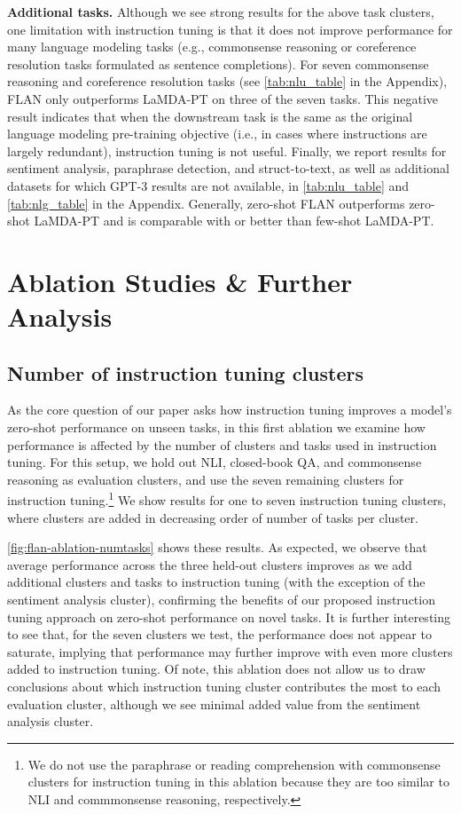\textbf{Additional tasks.} Although we see strong results for the above task clusters, one limitation with instruction tuning is that it does not improve performance for many language modeling tasks (e.g., commonsense reasoning or coreference resolution tasks formulated as sentence completions). For seven commonsense reasoning and coreference resolution tasks (see \ref{tab:nlu_table} in the Appendix), FLAN only outperforms LaMDA-PT on three of the seven tasks. This negative result indicates that when the downstream task is the same as the original language modeling pre-training objective (i.e., in cases where instructions are largely redundant), instruction tuning is not useful. Finally, we report results for sentiment analysis, paraphrase detection, and struct-to-text, as well as additional datasets for which GPT-3 results are not available, in \ref{tab:nlu_table} and \ref{tab:nlg_table} in the Appendix. Generally, zero-shot FLAN outperforms zero-shot LaMDA-PT and is comparable with or better than few-shot LaMDA-PT.

\section{Ablation Studies \& Further Analysis}

\subsection{Number of instruction tuning clusters}\label{subsec:finetuning_clusters}
As the core question of our paper asks how instruction tuning improves a model's zero-shot performance on unseen tasks, in this first ablation we examine how performance is affected by the number of clusters and tasks used in instruction tuning. For this setup, we hold out NLI, closed-book QA, and commonsense reasoning as evaluation clusters, and use the seven remaining clusters for instruction tuning.\footnote{We do not use the paraphrase or reading comprehension with commonsense clusters for instruction tuning in this ablation because they are too similar to NLI and commmonsense reasoning, respectively.} We show results for one to seven instruction tuning clusters, where clusters are added in decreasing order of number of tasks per cluster.

\ref{fig:flan-ablation-numtasks} shows these results. As expected, we observe that average performance across the three held-out clusters improves as we add additional clusters and tasks to instruction tuning (with the exception of the sentiment analysis cluster), confirming the benefits of our proposed instruction tuning approach on zero-shot performance on novel tasks. It is further interesting to see that, for the seven clusters we test, the performance does not appear to saturate, implying that performance may further improve with even more clusters added to instruction tuning. Of note, this ablation does not allow us to draw conclusions about which instruction tuning cluster contributes the most to each evaluation cluster, although we see minimal added value from the sentiment analysis cluster.

